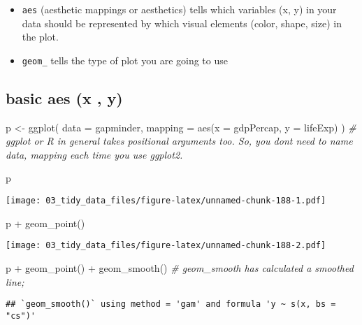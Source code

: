 \documentclass[
]{book}
\newenvironment{Shaded}{\begin{snugshade}}{\end{snugshade}}
\newcommand{\AttributeTok}[1]{\textcolor[rgb]{0.77,0.63,0.00}{#1}}
\newcommand{\CommentTok}[1]{\textcolor[rgb]{0.56,0.35,0.01}{\textit{#1}}}
\newcommand{\FunctionTok}[1]{\textcolor[rgb]{0.00,0.00,0.00}{#1}}
\newcommand{\NormalTok}[1]{#1}
\newcommand{\OtherTok}[1]{\textcolor[rgb]{0.56,0.35,0.01}{#1}}
\newcommand{\SpecialCharTok}[1]{\textcolor[rgb]{0.00,0.00,0.00}{#1}}
\begin{document}
\begin{itemize}
\item
  \texttt{aes} (aesthetic mappings or aesthetics) tells which variables (x, y) in your data should be represented by which visual elements (color, shape, size) in the plot.
\item
  \texttt{geom\_} tells the type of plot you are going to use
\end{itemize}

\hypertarget{basic-aes-x-y}{%
\subsection{basic aes (x , y)}\label{basic-aes-x-y}}

\begin{Shaded}
\begin{Highlighting}[]
\NormalTok{p }\OtherTok{\textless{}{-}} \FunctionTok{ggplot}\NormalTok{(}
  \AttributeTok{data =}\NormalTok{ gapminder,}
  \AttributeTok{mapping =} \FunctionTok{aes}\NormalTok{(}\AttributeTok{x =}\NormalTok{ gdpPercap, }\AttributeTok{y =}\NormalTok{ lifeExp)}
\NormalTok{) }\CommentTok{\# ggplot or R in general takes positional arguments too. So, you don\textquotesingle{}t need to name data, mapping each time you use ggplot2.}

\NormalTok{p}
\end{Highlighting}
\end{Shaded}

\texttt{[image: 03\_tidy\_data\_files/figure-latex/unnamed-chunk-188-1.pdf]}

\begin{Shaded}
\begin{Highlighting}[]
\NormalTok{p }\SpecialCharTok{+} \FunctionTok{geom\_point}\NormalTok{()}
\end{Highlighting}
\end{Shaded}

\texttt{[image: 03\_tidy\_data\_files/figure-latex/unnamed-chunk-188-2.pdf]}

\begin{Shaded}
\begin{Highlighting}[]
\NormalTok{p }\SpecialCharTok{+} \FunctionTok{geom\_point}\NormalTok{() }\SpecialCharTok{+} \FunctionTok{geom\_smooth}\NormalTok{() }\CommentTok{\# geom\_smooth has calculated a smoothed line;}
\end{Highlighting}
\end{Shaded}

\begin{verbatim}
## `geom_smooth()` using method = 'gam' and formula 'y ~ s(x, bs = "cs")'
\end{verbatim}
\end{document}
